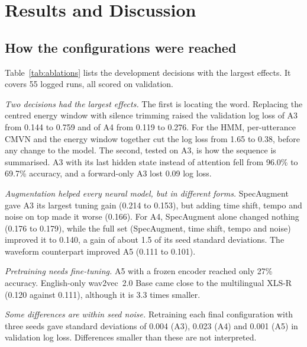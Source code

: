 \section{Results and Discussion}
\label{sec:results}

\subsection{How the configurations were reached}
Table~\ref{tab:ablations} lists the development decisions with the largest effects. It covers 55 logged runs, all
scored on validation.

\emph{Two decisions had the largest effects.} The first is locating the word. Replacing the centred energy window
with silence trimming raised the validation log loss of A3 from 0.144 to 0.759 and of A4 from 0.119 to 0.276. For
the HMM, per-utterance CMVN and the energy window together cut the log loss from 1.65 to 0.38, before any change to
the model. The second, tested on A3, is how the sequence is summarised. A3 with its last hidden state instead of
attention fell from 96.0\% to 69.7\% accuracy, and a forward-only A3 lost 0.09 log loss.

\emph{Augmentation helped every neural model, but in different forms.} SpecAugment gave A3 its largest tuning gain
(0.214 to 0.153), but adding time shift, tempo and noise on top made it worse (0.166). For A4, SpecAugment alone changed
nothing (0.176 to 0.179), while the full set (SpecAugment, time shift, tempo and noise) improved it to 0.140, a gain
of about 1.5 of its seed standard deviations. The waveform counterpart improved A5 (0.111 to 0.101).

\emph{Pretraining needs fine-tuning.} A5 with a frozen encoder reached only 27\% accuracy. English-only
wav2vec~2.0 Base came close to the multilingual XLS-R (0.120 against 0.111), although it is 3.3 times smaller.

\emph{Some differences are within seed noise.} Retraining each final configuration with three seeds gave standard
deviations of 0.004 (A3), 0.023 (A4) and 0.001 (A5) in validation log loss. Differences smaller than these are not
interpreted.

